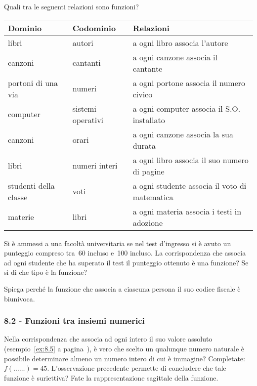 \begin{esercizio}
 \label{ese:8.3}
Quali tra le seguenti relazioni sono funzioni?
\begin{center}
 \begin{tabular}{*3{l}}
 \toprule
  Dominio & Codominio & Relazioni\\
\midrule
libri & autori & a ogni libro associa l'autore\\
canzoni & cantanti & a ogni canzone associa il cantante\\
portoni di una via & numeri & a ogni portone associa il numero civico\\
computer & sistemi operativi & a ogni computer associa il S.O. installato\\
canzoni & orari & a ogni canzone associa la sua durata\\
libri & numeri interi & a ogni libro associa il suo numero di pagine\\
studenti della classe & voti & a ogni studente associa il voto di matematica\\
materie & libri & a ogni materia associa i testi in adozione\\
\bottomrule
 \end{tabular}
\end{center}
\end{esercizio}

\begin{esercizio}
 \label{ese:8.4}
Si è ammessi a una facoltà universitaria se nel test
d'ingresso si è avuto un punteggio compreso tra~60
incluso e~100 incluso. La corrispondenza che associa ad ogni studente
che ha superato il test il punteggio ottenuto è una funzione? Se sì
di che tipo è la funzione?
\end{esercizio}


\begin{esercizio}
 \label{ese:8.5}
Spiega perché la funzione che associa a ciascuna
persona il suo codice fiscale è biunivoca.
\end{esercizio}

\subsubsection*{8.2 - Funzioni tra insiemi numerici}
\begin{esercizio}
 \label{ese:8.6}
Nella corrispondenza che associa ad ogni intero il suo valore assoluto (esempio~\ref{ex:8.5} a pagina~\pageref{ex:8.5}), è vero che scelto un qualunque numero naturale è
possibile determinare almeno un numero intero di cui è immagine?
Completate:~$f(\ldots\ldots) = 45.$
L'osservazione precedente permette di concludere che
tale funzione è suriettiva?
Fate la rappresentazione sagittale della funzione.
\end{esercizio}

